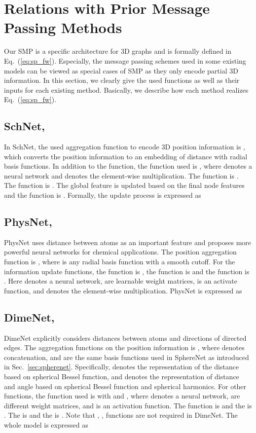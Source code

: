 \documentclass{article}
\begin{document}
\section{Relations with Prior Message Passing Methods} \label{sec:supp_C}
Our SMP is a specific architecture for 3D graphs
and is formally defined in Eq.~(\ref{eq:sp_fw}).
Especially, the message passing schemes used in some existing models can be viewed as special cases of SMP as they only encode
partial 3D information.
In this section, we clearly give the used functions as well as their inputs for each existing method.
Basically,
we describe how each method realizes Eq.~(\ref{eq:sp_fw}).

\subsection[SchNet,]{SchNet, \cite{schutt2017schnet}}
In SchNet, the used aggregation function to encode 3D position information is  , which converts the position information to an embedding of distance with radial basis functions. In addition to the  function, the  function used is , where  denotes a neural network and  denotes the element-wise multiplication. The  function is . The  function is . The global feature  is updated based on the final node features  and the function is .
Formally, the update process is expressed as



\subsection[PhysNet,]{PhysNet, ~\cite{unke2019physnet}}
PhysNet uses distance between atoms as an important feature and proposes more powerful neural networks for chemical applications. The position aggregation function is , where  is any radial basis function with a smooth cutoff. For the information update functions, the  function is , the  function is  and the  function is . Here  denotes a neural network,  are learnable weight matrices,  is an activate function, and  denotes the element-wise multiplication. PhysNet is expressed as



\subsection[DimeNet,]{DimeNet, \cite{klicpera_dimenet_2020}}
DimeNet explicitly considers distances between atoms and directions of directed edges.
The aggregation functions on the position information is , where  denotes concatenation,
 and  are the same basis functions used in SphereNet
as introduced in Sec.~\ref{sec:spherenet}. Specifically,
 denotes the representation of the distance based on spherical Bessel function, and  denotes the representation of distance and angle based on spherical Bessel function and spherical harmonics. For other functions, the  function used is  with  and , where  denotes a neural network,  are different weight matrices, and  is an activation function. The  function is  and the  is . The  is  and the  is . 
Note that , ,  functions are not required in DimeNet. The whole model is expressed as
\end{document}
